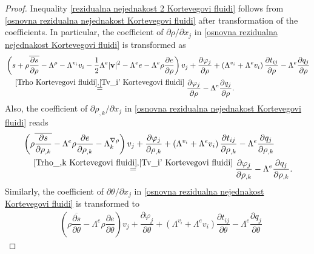 \documentclass[a4paper,fleqn]{cas-sc}
\theoremstyle{definition}
\begin{document}
\begin{proof}
	Inequality \eqref{rezidualna nejednakost 2 Kortevegovi fluidi} follows from \eqref{osnovna rezidualna nejednakost Kortevegovi fluidi} after transformation of the coefficients. In particular, the coefficient of $\partial\rho/\partial x_j$ in \eqref{osnovna rezidualna nejednakost Kortevegovi fluidi} is transformed as
	\begin{align} \label{koeficijent uz rho po x_j Kortevegovi fluidi}
		& \left(s+\rho\overline{\dfrac{\partial s}{\partial\rho}} - \Lambda^\rho - \Lambda^{v_i}v_i 
		- \dfrac{1}{2}\Lambda^e|\mathbf{v}|^2-\Lambda^ e e 
		- \Lambda^e\rho\dfrac{\partial e}{\partial\rho}\right)v_j 
		+ \dfrac{\partial\varphi_j}{\partial\rho} 
		+ \left( \Lambda^{v_i} + \Lambda^ev_i \right) \dfrac{\partial t_{ij}}{\partial\rho} 
		- \Lambda^e\dfrac{\partial q_j}{\partial\rho} 
		\\
		& \quad \overset{\eqref{Trho Kortevegovi fluidi},\eqref{Tv_i' Kortevegovi fluidi}}{=}\dfrac{\partial\varphi_j}{\partial\rho}-\Lambda^e\dfrac{\partial q_j}{\partial\rho}. 
		\nonumber 
	\end{align}
	Also, the coefficient of $\partial\rho_{,k}/\partial x_j$ in \eqref{osnovna rezidualna nejednakost Kortevegovi fluidi} reads 
	\begin{align} \label{koeficijent uz rho_,k po x_j Kortevegovi fluidi}
		& \left(\rho\overline{\dfrac{\partial s}{\partial\rho_{,k}}} 
		- \Lambda^e\rho\dfrac{\partial e}{\partial\rho_{,k}} - \Lambda^{\nabla\rho}_k\right)v_j 
		+ \dfrac{\partial\varphi_j}{\partial\rho_{,k}} 
		+ \left( \Lambda^{v_i} + \Lambda^e v_i \right) \dfrac{\partial t_{ij}}{\partial\rho_{,k}} 
		- \Lambda^e \dfrac{\partial q_j}{\partial\rho_{,k}} 
		\\
		& \quad \overset{\eqref{Trho_,k Kortevegovi fluidi},\eqref{Tv_i' Kortevegovi fluidi}}{=} \dfrac{\partial\varphi_j}{\partial\rho_{,k}}-\Lambda^e\dfrac{\partial q_j}{\partial\rho_{,k}}. 
		\nonumber 
	\end{align}
	Similarly, the coefficient of $\partial\theta/\partial x_j$ in \eqref{osnovna rezidualna nejednakost Kortevegovi fluidi} is transformed to 
	\begin{align} \label{koeficijent uz theta po x_j Kortevegovi fluidi}
		& \left(\rho\overline{\dfrac{\partial s}{\partial\theta}} 
		- \Lambda^e\rho\dfrac{\partial e}{\partial\theta}\right) v_j 
		+ \dfrac{\partial\varphi_j}{\partial\theta} 
		+ \left( \Lambda^{v_i} + \Lambda^e v_i \right) \dfrac{\partial t_{ij}}{\partial\theta} 
		- \Lambda^e\dfrac{\partial q_j}{\partial\theta} 

\end{align}
\end{proof}
\end{document}
